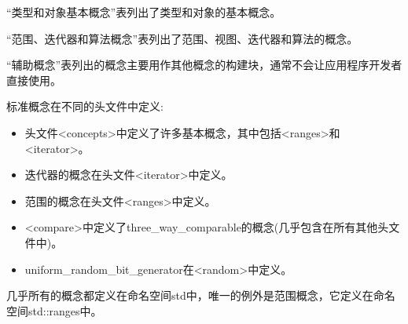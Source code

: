 
“类型和对象基本概念”表列出了类型和对象的基本概念。

“范围、迭代器和算法概念”表列出了范围、视图、迭代器和算法的概念。

“辅助概念”表列出的概念主要用作其他概念的构建块，通常不会让应用程序开发者直接使用。


标准概念在不同的头文件中定义:

\begin{itemize}
\item
头文件<concepts>中定义了许多基本概念，其中包括<ranges>和<iterator>。

\item
迭代器的概念在头文件<iterator>中定义。

\item
范围的概念在头文件<ranges>中定义。

\item
<compare>中定义了three\_way\_comparable的概念(几乎包含在所有其他头文件中)。

\item
uniform\_random\_bit\_generator在<random>中定义。
\end{itemize}

几乎所有的概念都定义在命名空间std中，唯一的例外是范围概念，它定义在命名空间std::ranges中。

